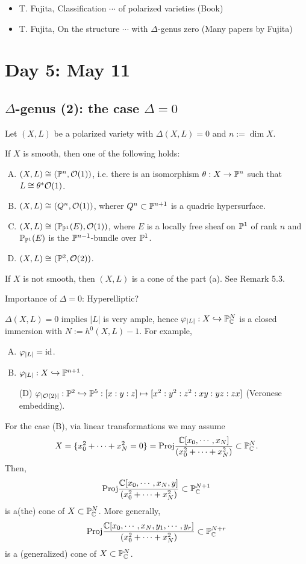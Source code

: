 \documentclass{../../small}
\begin{document}
\begin{itemize}
	\item T. Fujita, Classification $\cdots$ of polarized varieties (Book)
	\item T. Fujita, On the structure $\cdots$ with $\Delta$-genus zero (Many papers by Fujita)
\end{itemize}


\newpage
\section{Day 5: May 11}

\subsection*{$\Delta$-genus (2): the case $\Delta=0$}

\begin{thm}
Let $(X,L)$ be a polarized variety with $\Delta(X,L)=0$ and $n:=\dim X$.
\begin{parts}
\item If $X$ is smooth, then one of the following holds:
\begin{enumerate}[(A)]
\item $(X,L)\cong(\P^n,\cO(1))$, i.e. there is an isomorphism $\theta:X\to\P^n$ such that $L\cong\theta^*\cO(1)$.
\item $(X,L)\cong(Q^n,\cO(1))$, wherer $Q^n\subset\P^{n+1}$ is a quadric hypersurface.
\item $(X,L)\cong(\P_{\P^1}(E),\cO(1))$, where $E$ is a locally free sheaf on $\P^1$ of rank $n$ and $\P_{\P^1}(E)$ is the $\P^{n-1}$-bundle over $\P^1$.
\item $(X,L)\cong(\P^2,\cO(2))$.
\end{enumerate}
\item If $X$ is not smooth, then $(X,L)$ is a cone of the part (a). See Remark 5.3.
\end{parts}
\end{thm}
Importance of $\Delta=0$: Hyperelliptic?
\begin{rmk}
$\Delta(X,L)=0$ implies $|L|$ is very ample, hence $\f_{|L|}:X\hookrightarrow\P_\C^N$ is a closed immersion with $N:=h^0(X,L)-1$.
For example,
\begin{enumerate}[(A)]
\item $\f_{|L|}=\id$.
\item $\f_{|L|}:X\hookrightarrow\P^{n+1}$.
\item[(D)] $\f_{|\cO(2)|}:\P^2\hookrightarrow\P^5:[x:y:z]\mapsto[x^2:y^2:z^2:xy:yz:zx]$ (Veronese embedding).
\end{enumerate}
\end{rmk}
\begin{rmk}
For the case (B), via linear transformations we may assume
\[X=\{x_0^2+\cdots+x_N^2=0\}=\mathrm{Proj}\frac{\C[x_0,\cdots,x_N]}{(x_0^2+\cdots+x_N^2)}\subset\P_\C^N.\]
Then,
\[\mathrm{Proj}\frac{\C[x_0,\cdots,x_N,y]}{(x_0^2+\cdots+x_N^2)}\subset\P_\C^{N+1}\]
is a(the) cone of $X\subset\P_\C^N$.
More generally,
\[\mathrm{Proj}\frac{\C[x_0,\cdots,x_N,y_1,\cdots,y_r]}{(x_0^2+\cdots+x_N^2)}\subset\P_\C^{N+r}\]
is a (generalized) cone of $X\subset\P_\C^N$.
\end{rmk}
\end{document}
